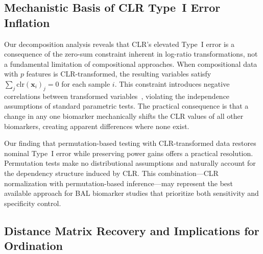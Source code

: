 \documentclass[12pt]{article}
\begin{document}
\subsection{Mechanistic Basis of CLR Type~I Error Inflation}

Our decomposition analysis reveals that CLR's elevated Type~I error is a consequence of the zero-sum constraint inherent in log-ratio transformations, not a fundamental limitation of compositional approaches. When compositional data with $p$ features is CLR-transformed, the resulting variables satisfy $\sum_j \mathrm{clr}(\mathbf{x}_i)_j = 0$ for each sample $i$. This constraint introduces negative correlations between transformed variables~\cite{Aitchison1986,Gloor2017}, violating the independence assumptions of standard parametric tests. The practical consequence is that a change in any one biomarker mechanically shifts the CLR values of all other biomarkers, creating apparent differences where none exist.

Our finding that permutation-based testing with CLR-transformed data restores nominal Type~I error while preserving power gains offers a practical resolution. Permutation tests make no distributional assumptions and naturally account for the dependency structure induced by CLR. This combination---CLR normalization with permutation-based inference---may represent the best available approach for BAL biomarker studies that prioritize both sensitivity and specificity control.

\subsection{Distance Matrix Recovery and Implications for Ordination}
\end{document}
